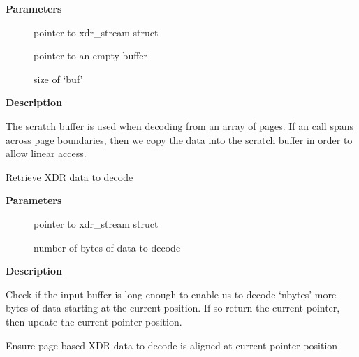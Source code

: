 \documentclass[a4paper,8pt,english]{sphinxmanual}
\begin{document}
\textbf{Parameters}
\begin{description}
\item[{}] \leavevmode
pointer to xdr\_stream struct

\item[{}] \leavevmode
pointer to an empty buffer

\item[{}] \leavevmode
size of `buf'

\end{description}

\textbf{Description}

The scratch buffer is used when decoding from an array of pages.
If an {\hyperref[networking/kapi:c.xdr_inline_decode]{\emph{}}} call spans across page boundaries, then
we copy the data into the scratch buffer in order to allow linear
access.

\begin{fulllineitems}
\label{networking/kapi:c.xdr_inline_decode}
Retrieve XDR data to decode

\end{fulllineitems}


\textbf{Parameters}
\begin{description}
\item[{}] \leavevmode
pointer to xdr\_stream struct

\item[{}] \leavevmode
number of bytes of data to decode

\end{description}

\textbf{Description}

Check if the input buffer is long enough to enable us to decode
`nbytes' more bytes of data starting at the current position.
If so return the current pointer, then update the current
pointer position.

\begin{fulllineitems}
\label{networking/kapi:c.xdr_read_pages}
Ensure page-based XDR data to decode is aligned at current pointer position

\end{fulllineitems}
\end{document}
